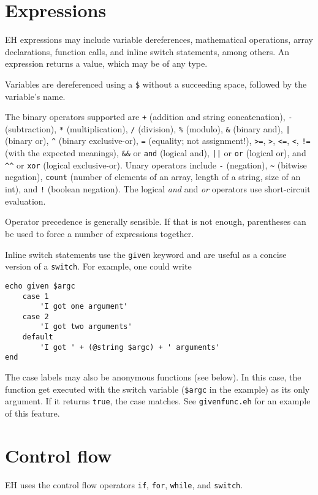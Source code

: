 \documentclass{article}
\begin{document}
\section{Expressions}
EH expressions may include variable dereferences, mathematical operations, array declarations, function calls, and inline switch statements, among others. 
An expression returns a value, which may be of any type.

Variables are dereferenced using a \verb#$# without a succeeding space, followed by the variable's name.

The binary operators supported are \verb#+# (addition and string concatenation), \verb#-# (subtraction), \verb#*# (multiplication), \verb#/# (division), \verb#%# (modulo), \verb#&# (binary and), \verb#|# (binary or), \verb#^# (binary exclusive-or), \verb#=# (equality; not assignment!), \verb#>=#, \verb#>#, \verb#<=#, \verb#<#, \verb#!=# (with the expected meanings), \verb#&&# or \verb#and# (logical and), \verb#||# or \verb#or# (logical or), and \verb#^^# or \verb#xor# (logical exclusive-or). 
Unary operators include \verb#-# (negation), \verb#~# (bitwise negation), \verb#count# (number of elements of an array, length of a string, size of an int), and \verb#!# (boolean negation). 
The logical \textit{and} and \textit{or} operators use short-circuit evaluation.

Operator precedence is generally sensible.
If that is not enough, parentheses can be used to force a number of expressions together.

Inline switch statements use the \verb#given# keyword and are useful as a concise version of a \verb#switch#. 
For example, one could write
\begin{verbatim}
echo given $argc
	case 1
		'I got one argument'
	case 2
		'I got two arguments'
	default
		'I got ' + (@string $argc) + ' arguments'
end
\end{verbatim}
The case labels may also be anonymous functions (see below).
In this case, the function get executed with the switch variable (\verb#$argc# in the example) as its only argument. 
If it returns \verb#true#, the case matches.
See \verb#givenfunc.eh# for an example of this feature.

\section{Control flow}
EH uses the control flow operators \verb#if#, \verb#for#, \verb#while#, and \verb#switch#.
\end{document}
